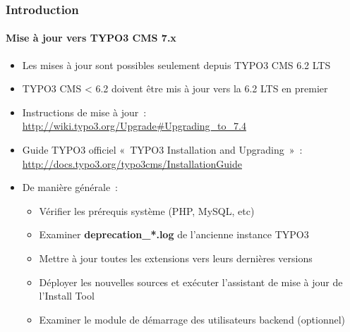 \begin{frame}[fragile]
	\frametitle{Introduction}
	\framesubtitle{Mise à jour vers TYPO3 CMS 7.x}

	\begin{itemize}
		\item Les mises à jour sont possibles seulement depuis TYPO3 CMS 6.2 LTS
		\item TYPO3 CMS < 6.2 doivent être mis à jour vers la 6.2 LTS en premier
	\end{itemize}

	\begin{itemize}

		\item Instructions de mise à jour~:\newline
			\smaller\url{http://wiki.typo3.org/Upgrade#Upgrading_to_7.4}\normalsize
		\item Guide TYPO3 officiel «~TYPO3 Installation and Upgrading~»~:
			\smaller\url{http://docs.typo3.org/typo3cms/InstallationGuide}\normalsize
		\item De manière générale~:
			\begin{itemize}
				\item Vérifier les prérequis système \small(PHP, MySQL, etc)
				\item Examiner \textbf{deprecation\_*.log} de l'ancienne instance TYPO3
				\item Mettre à jour toutes les extensions vers leurs dernières versions
				\item Déployer les nouvelles sources et exécuter l'assistant de mise à jour de l'Install Tool
				\item Examiner le module de démarrage des utilisateurs backend (optionnel)
			\end{itemize}
	\end{itemize}

\end{frame}

